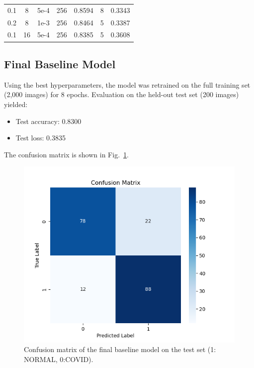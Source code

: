 \documentclass[conference]{IEEEtran}
\begin{document}
\begin{table}[htbp]
\begin{adjustbox}{width=0.48\textwidth}
\begin{tabular}{|c|c|c|c|c|c|c|}
			0.1           & 8            & 5e-4            & 256           & 0.8594           & 8            & 0.3343           \\
			0.2           & 8            & 1e-3            & 256           & 0.8464           & 5            & 0.3387           \\
			0.1           & 16           & 5e-4            & 256           & 0.8385           & 5            & 0.3608           \\
			\hline
		\end{tabular}
	\end{adjustbox}
\end{table}


\subsection{Final Baseline Model}
Using the best hyperparameters, the model was retrained on the full training set (2,000 images) for 8 epochs. Evaluation on the held-out test set (200 images) yielded:
\begin{itemize}
	\item Test accuracy: 0.8300
	\item Test loss: 0.3835
\end{itemize}

The confusion matrix is shown in Fig.~\ref{fig:conf_matrix}.

\begin{figure}[htbp]
	\centerline{\includegraphics[width=\linewidth]{Images/confusion_matrix_baseline.png}}
	\caption{Confusion matrix of the final baseline model on the test set (1: NORMAL, 0:COVID).}
	\label{fig:conf_matrix}
\end{figure}
\end{document}
